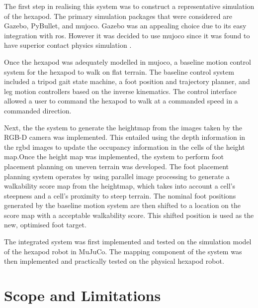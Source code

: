     The first step in realising this system was to construct a representative simulation of the hexapod. The primary simulation packages that were considered are Gazebo, PyBullet, and \ac{mujoco}. Gazebo was an appealing choice due to its easy integration with \acf{ros}. However it was decided to use \ac{mujoco} since it was found to have superior contact physics simulation \citep{Erez-2015}.

    Once the hexapod was adequately modelled in \ac{mujoco}, a baseline motion control system for the hexapod to walk on flat terrain. The baseline control system included a tripod gait state machine,
    a foot position and trajectory planner, and leg motion controllers based on the inverse kinematics. The control interface allowed a user to command the hexapod to walk at a commanded speed in a commanded direction.

    Next, the the system to generate the heightmap from the images taken by the RGB-D camera was implemented. This entailed using the depth information in the \ac{rgbd} images to update the occupancy information in the cells of the height map.Once the height map was implemented, the system to perform foot placement planning on uneven terrain was developed.     The foot placement planning system operates by using parallel image processing to generate a walkability score map from the heightmap, which takes into account a cell's steepness and a cell's proximity to steep terrain. The nominal foot positions generated by the baseline motion system are then shifted to a location on the score map with a acceptable walkability score. This shifted position is used as the new, optimised foot target.

    The integrated system was first implemented and tested on the simulation model of the hexapod robot in MuJuCo. The mapping component of the system was then implemented and practically tested on the physical hexapod robot.

\section{Scope and Limitations}


    
